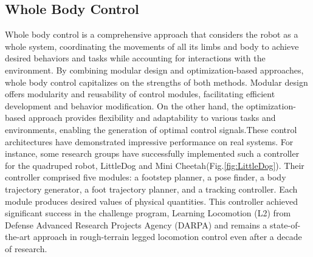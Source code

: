 \subsection{Whole Body Control}
Whole body control is a comprehensive approach that considers the robot as a whole system, coordinating the movements of all its limbs and body to achieve desired behaviors and tasks while accounting for interactions with the environment. By combining modular design and optimization-based approaches, whole body control capitalizes on the strengths of both methods. Modular design offers modularity and reusability of control modules, facilitating efficient development and behavior modification. On the other hand, the optimization-based approach provides flexibility and adaptability to various tasks and environments, enabling the generation of optimal control signals.These control architectures have demonstrated impressive performance on real systems. For instance, some research groups\cite{kalakrishnan2010Fast,bledt2018MIT} have successfully implemented such a controller for the quadruped robot, LittleDog and Mini Cheetah(Fig.\ref{fig:LittleDog}). Their controller comprised five modules: a footstep planner, a pose finder, a body trajectory generator, a foot trajectory planner, and a tracking controller. Each module produces desired values of physical quantities. This controller achieved significant success in the challenge program\cite{neuhaus2011Comprehensive}, Learning Locomotion (L2) from Defense Advanced Research Projects Agency (DARPA) and remains a state-of-the-art approach in rough-terrain legged locomotion control even after a decade of research.
